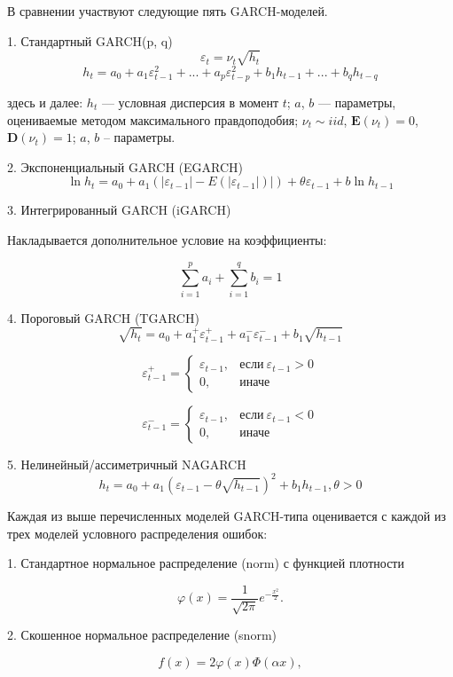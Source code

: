 \documentclass[]{article}
\begin{document}
В сравнении участвуют следующие пять GARCH-моделей.

1. Стандартный GARCH(p, q)
$$\varepsilon_t = \nu_t \sqrt{h_t}$$
$$h_t = a_0 + a_1\varepsilon_{t-1}^2 + ... + a_p\varepsilon_{t-p}^2 + b_1 h_{t-1} + ... + b_q h_{t-q}$$

здесь и далее: $h_t$ — условная дисперсия в момент $t$; $a$, $b$ — параметры, оцениваемые методом максимального правдоподобия; $\nu_t \sim iid$, $\mathbf{E}(\nu_t) = 0$, $\mathbf{D}(\nu_t) = 1$; $a$, $b$ -- параметры.

2. Экспоненциальный GARCH (EGARCH)
$$\ln{h_t} = a_0 + a_1(|\varepsilon_{t-1}| - E(|\varepsilon_{t-1}|)|) + \theta\varepsilon_{t-1} + b\ln{h_{t-1}}$$

3. Интегрированный GARCH (iGARCH)

Накладывается дополнительное условие на коэффициенты:

$$\sum_{i=1}^{p} a_i + \sum_{i=1}^{q} b_i = 1$$

4. Пороговый GARCH (TGARCH)
$$\sqrt{h_t} = a_0 + a_1^{+}\varepsilon_{t-1}^{+} + a_1^{-}\varepsilon_{t-1}^{-} + b_1\sqrt{h_{t-1}}$$

$$
	\varepsilon_{t-1}^{+} =
	\begin{cases}
		\varepsilon_{t-1}, & \text{если} \ \varepsilon_{t-1} > 0 \\
		0, & \text{иначе}
	\end{cases}
$$

$$
	\varepsilon_{t-1}^{-} =
	\begin{cases}
		\varepsilon_{t-1}, & \text{если} \ \varepsilon_{t-1} < 0 \\
		0, & \text{иначе}
	\end{cases}
$$

5. Нелинейный/ассиметричный NAGARCH
$$h_t = a_0 + a_1(\varepsilon_{t-1} - \theta\sqrt{h_{t-1}})^2 + b_1 h_{t-1}, \theta > 0$$


Каждая из выше перечисленных моделей GARCH-типа оценивается с каждой из трех моделей условного распределения ошибок:

1. Стандартное нормальное распределение (norm) с функцией плотности

\begin{equation}
	\varphi(x) = \frac{1}{\sqrt{2\pi}} e^{-\frac{x^2}{2}}.
\end{equation}

2. Скошенное нормальное распределение (snorm)

\begin{equation}
	f(x) = 2\varphi(x)\Phi(\alpha x),
\end{equation}
\end{document}
